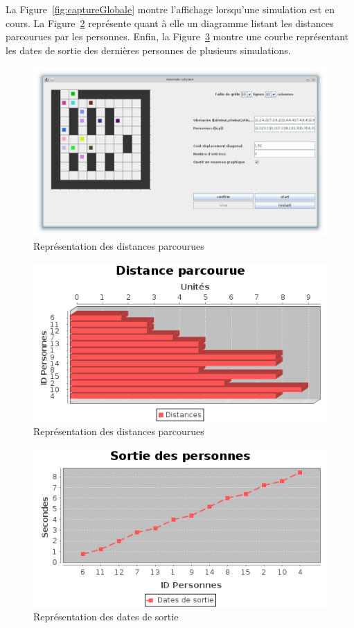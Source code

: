 	La Figure~\ref{fig:captureGlobale} montre l'affichage lorsqu'une simulation est en cours. La Figure~\ref{fig:distances_parcourues} représente quant à elle un diagramme listant les distances parcourues par les personnes. Enfin, la Figure~\ref{fig:dateSortie} montre une courbe représentant les dates de sortie des dernières personnes de plusieurs simulations.

	\begin{figure}[H]
	\centering
	\includegraphics[scale=0.4]{imagesPNG/captureGlobale.png}
	\caption{Représentation des distances parcourues\label{fig:distances_parcourues}}
	\end{figure}

	\begin{figure}[H]
	\centering
	\includegraphics[scale=0.7]{imagesPNG/distanceParcourue.png}
	\caption{Représentation des distances parcourues\label{fig:distances_parcourues}}
	\end{figure}
	
	\begin{figure}[H]
	\centering
	\includegraphics[scale=0.7]{imagesPNG/dateSortie.png}
	\caption{Représentation des dates de sortie\label{fig:dateSortie}}
	\end{figure}